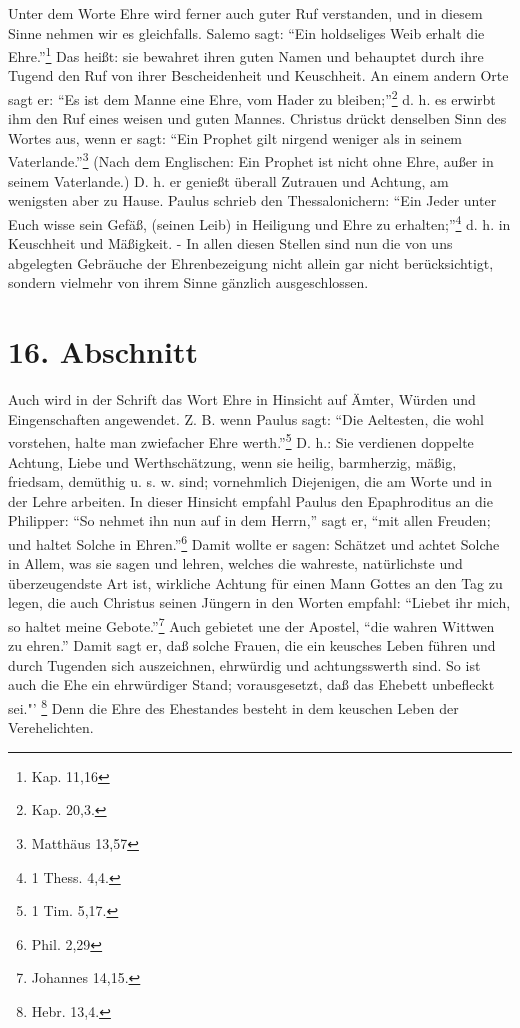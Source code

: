 Unter dem Worte Ehre wird ferner auch guter Ruf verstanden, und in diesem Sinne
nehmen wir es gleichfalls. Salemo sagt: "`Ein holdseliges Weib erhalt die
Ehre."'\footnote{Kap. 11,16} Das heißt: sie bewahret ihren guten Namen und
behauptet durch ihre Tugend den Ruf von ihrer Bescheidenheit und Keuschheit. An
einem andern Orte sagt er: "`Es ist dem Manne eine Ehre, vom Hader zu
bleiben;"'\footnote{Kap. 20,3.} d. h. es erwirbt ihm den Ruf eines weisen und
guten Mannes. Christus drückt denselben Sinn des Wortes aus, wenn er sagt: "`Ein
Prophet gilt nirgend weniger als in seinem Vaterlande."'\footnote{Matthäus 13,57}
(Nach dem Englischen: Ein Prophet ist nicht ohne Ehre, außer in seinem
Vaterlande.) D. h. er genießt überall Zutrauen und Achtung, am wenigsten aber zu
Hause. Paulus schrieb den Thessalonichern: "`Ein Jeder unter Euch wisse sein
Gefäß, (seinen Leib) in Heiligung und Ehre zu erhalten;"'\footnote{1 Thess.
4,4.} d. h. in Keuschheit und Mäßigkeit. - In allen diesen Stellen sind nun die
von uns abgelegten Gebräuche der Ehrenbezeigung nicht allein gar nicht
berücksichtigt, sondern vielmehr von ihrem Sinne gänzlich ausgeschlossen.

\section{16. Abschnitt} \label{kap9_ab16}

Auch wird in der Schrift das Wort Ehre in Hinsicht auf Ämter, Würden und
Eingenschaften angewendet. Z. B. wenn Paulus sagt: "`Die Aeltesten, die wohl
vorstehen, halte man zwiefacher Ehre werth."'\footnote{1 Tim. 5,17.} D. h.: Sie
verdienen doppelte Achtung, Liebe und Werthschätzung, wenn sie heilig,
barmherzig, mäßig, friedsam, demüthig u. s. w. sind; vornehmlich Diejenigen, die
am Worte und in der Lehre arbeiten. In dieser Hinsicht empfahl Paulus den
Epaphroditus an die Philipper: "`So nehmet ihn nun auf in dem Herrn,"' sagt er,
"`mit allen Freuden; und haltet Solche in Ehren."'\footnote{Phil. 2,29} Damit
wollte er sagen: Schätzet und achtet Solche in Allem, was sie sagen und lehren,
welches die wahreste, natürlichste und überzeugendste Art ist, wirkliche Achtung
für einen Mann Gottes an den Tag zu legen, die auch Christus seinen Jüngern in
den Worten empfahl: "`Liebet ihr mich, so haltet meine Gebote."'\footnote{Johannes
14,15.} Auch gebietet une der Apostel, "`die wahren Wittwen zu ehren."' Damit
sagt er, daß solche Frauen, die ein keusches Leben führen und durch Tugenden
sich auszeichnen, ehrwürdig und achtungsswerth sind. So ist auch die Ehe ein
ehrwürdiger Stand; vorausgesetzt, daß das Ehebett unbefleckt sei."'
\footnote{Hebr. 13,4.} Denn die Ehre des Ehestandes besteht in dem keuschen
Leben der Verehelichten.

